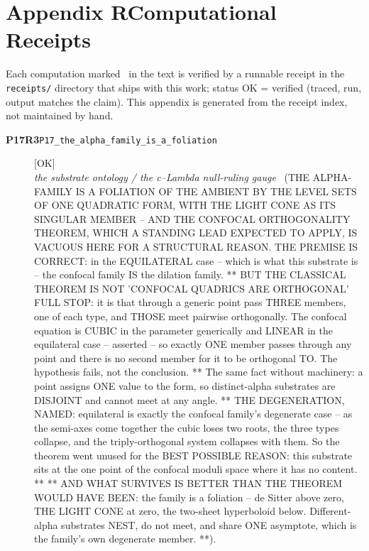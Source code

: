 \clearpage
\section*{Appendix R\quad Computational Receipts}\label{app:receipts}
\small\noindent Each computation marked \rcptmarker\ in the text is verified by a runnable receipt in the \texttt{receipts/} directory that ships with this work; status \textsf{OK} = verified (traced, run, output matches the claim). This appendix is generated from the receipt index, not maintained by hand.\par\medskip
\begingroup\renewcommand{\arraystretch}{1.25}
\begin{description}
\item[\textbf{P17R3}\quad\texttt{P17\_the\_alpha\_family\_is\_a\_foliation}]\hfill\textsf{[OK]}\\
\textit{the substrate ontology / the c--Lambda null-ruling gauge} \ (THE ALPHA-FAMILY IS A FOLIATION OF THE AMBIENT BY THE LEVEL SETS OF ONE QUADRATIC FORM, WITH THE LIGHT CONE AS ITS SINGULAR MEMBER -- AND THE CONFOCAL ORTHOGONALITY THEOREM, WHICH A STANDING LEAD EXPECTED TO APPLY, IS VACUOUS HERE FOR A STRUCTURAL REASON. THE PREMISE IS CORRECT: in the EQUILATERAL case -- which is what this substrate is -- the confocal family IS the dilation family. ** BUT THE CLASSICAL THEOREM IS NOT 'CONFOCAL QUADRICS ARE ORTHOGONAL' FULL STOP: it is that through a generic point pass THREE members, one of each type, and THOSE meet pairwise orthogonally. The confocal equation is CUBIC in the parameter generically and LINEAR in the equilateral case -- asserted -- so exactly ONE member passes through any point and there is no second member for it to be orthogonal TO. The hypothesis fails, not the conclusion. ** The same fact without machinery: a point assigns ONE value to the form, so distinct-alpha substrates are DISJOINT and cannot meet at any angle. ** THE DEGENERATION, NAMED: equilateral is exactly the confocal family's degenerate case -- as the semi-axes come together the cubic loses two roots, the three types collapse, and the triply-orthogonal system collapses with them. So the theorem went unused for the BEST POSSIBLE REASON: this substrate sits at the one point of the confocal moduli space where it has no content. ** ** AND WHAT SURVIVES IS BETTER THAN THE THEOREM WOULD HAVE BEEN: the family is a foliation -- de Sitter above zero, THE LIGHT CONE at zero, the two-sheet hyperboloid below. Different-alpha substrates NEST, do not meet, and share ONE asymptote, which is the family's own degenerate member. **). 

\end{description}
